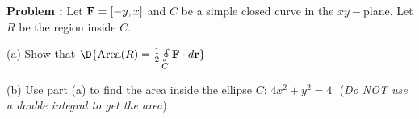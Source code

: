 {\bf Problem :} Let ${\bf F} = [-y,x]$ and $C$ be a simple closed curve in the $xy-$plane. Let $R$ be the region inside $C$.
 
(a) Show that $\D{\text{Area}(R) = \frac{1}{2}\oint \limits_{C} \text{\bf F} \cdot d\text{\bf r}}$

(b) Use part (a) to find the area inside the ellipse $C$: $4x^2 + y^2 = 4$ \,\,({\em Do NOT use a double integral to get the area})